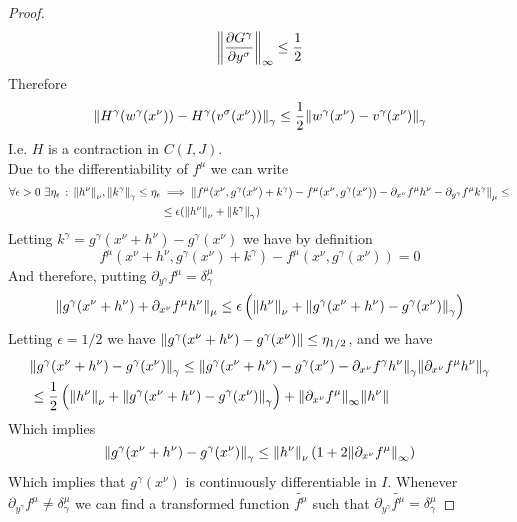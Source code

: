 \documentclass[../complete.tex]{subfiles}
\begin{document}
\begin{proof}
	\begin{equation*}
		\norm{\pdv{G^\gamma}{y^\sigma}}_\infty\le\frac{1}{2}
	\end{equation*}
	Therefore
	\begin{equation*}
		\norm{H^\gamma(w^\gamma(x^\nu))-H^\gamma(v^\sigma(x^\nu))}_\gamma\le\frac{1}{2}\norm{w^\gamma(x^\nu)-v^\gamma(x^\nu)}_\gamma
	\end{equation*}
	I.e. $H$ is a contraction in $C(I,J)$.\\
	Due to the differentiability of $f^\mu$ we can write
	\begin{equation*}
		\begin{aligned}
			\forall\epsilon>0\ \exists\eta_\epsilon\st\norm{h^\nu}_\nu,\norm{k^\gamma}_\gamma\le\eta_\epsilon&\implies\norm{f^\mu(x^\nu,g^\gamma(x^\nu)+k^\gamma)-f^\mu(x^\nu,g^\gamma(x^\nu))-\partial_{x^\nu}f^\mu h^\nu-\partial_{y^\gamma}f^\mu k^\gamma}_\mu\le\\
			&\le\epsilon(\norm{h^\nu}_\nu+\norm{k^\gamma}_\gamma)
		\end{aligned}
	\end{equation*}
	Letting $k^\gamma=g^\gamma(x^\nu+h^\nu)-g^\gamma(x^\nu)$ we have by definition
	\begin{equation*}
		f^\mu(x^\nu+h^\nu,g^\gamma(x^\nu)+k^\gamma)-f^\mu(x^\nu,g^\gamma(x^\nu))=0
	\end{equation*}
	And therefore, putting $\partial_{y^\gamma}f^\mu=\delta^\mu_\gamma$
	\begin{equation*}
		\norm{g^\gamma(x^\nu+h^\nu)+\partial_{x^\nu}f^\mu h^\nu}_\mu\le\epsilon\left( \norm{h^\nu}_\nu+\norm{g^\gamma(x^\nu+h^\nu)-g^\gamma(x^\nu)}_\gamma \right)
	\end{equation*}
	Letting $\epsilon=1/2$ we have $\norm{g^\gamma(x^\nu+h^\nu)-g^\gamma(x^\nu)}\le\eta_{1/2}$, and we have
	\begin{equation*}
		\begin{aligned}
			&\norm{g^\gamma(x^\nu+h^\nu)-g^\gamma(x^\nu)}_\gamma\le\norm{g^\gamma(x^\nu+h^\nu)-g^\gamma(x^\nu)-\partial_{x^\nu}f^\gamma h^\nu}_\gamma\norm{\partial_{x^\nu}f^\mu h^\nu}_\gamma\\
			&\le\frac{1}{2}\left( \norm{h^\nu}_\nu+\norm{g^\gamma(x^\nu+h^\nu)-g^\gamma(x^\nu)}_\gamma \right)+\norm{\partial_{x^\nu}f^\mu}_\infty\norm{h^\nu}
		\end{aligned}
	\end{equation*}
	Which implies
	\begin{equation*}
		\norm{g^\gamma(x^\nu+h^\nu)-g^\gamma(x^\nu)}_\gamma\le\norm{h^\nu}_\nu\left( 1+2\norm{\partial_{x^\nu}f^\mu}_\infty \right)
	\end{equation*}
	Which implies that $g^\gamma(x^\nu)$ is continuously differentiable in $I$. Whenever $\partial_{y^\gamma}f^\mu\ne\delta^\mu_\gamma$ we can find a transformed function $\tilde{f^\mu}$ such that $\partial_{y^\gamma}\tilde{f^\mu}=\delta^\mu_\gamma$
\end{proof}
\end{document}
